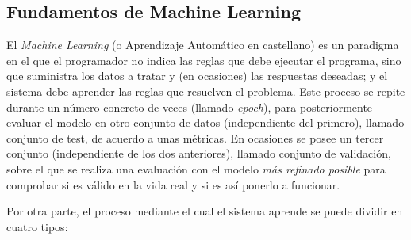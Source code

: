 \documentclass[../main.tex]{subfiles}
\begin{document}
\subsection{Fundamentos de Machine Learning}

El \textit{Machine Learning} (o Aprendizaje Automático en castellano) es un paradigma en el que el programador no indica las reglas que debe ejecutar el programa, sino que suministra los datos a tratar y (en ocasiones) las respuestas deseadas; y el sistema debe aprender las reglas que resuelven el problema. \newline
Este proceso se repite durante un número concreto de veces (llamado \textit{epoch}), para posteriormente evaluar el modelo en otro conjunto de datos (independiente del primero), llamado conjunto de test, de acuerdo a unas métricas. \newline
En ocasiones se posee un tercer conjunto (independiente de los dos anteriores), llamado conjunto de validación, sobre el que se realiza una evaluación con el modelo \textit{más refinado posible} para comprobar si es válido en la vida real y si es así ponerlo a funcionar.

Por otra parte, el proceso mediante el cual el sistema aprende se puede dividir en cuatro tipos:
\end{document}
